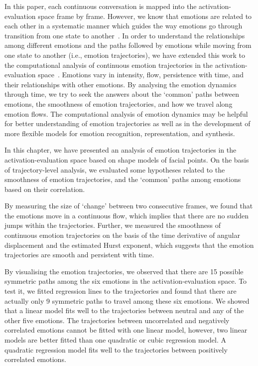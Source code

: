 \documentclass[10pt,journal,cspaper,compsoc]{IEEEtran}
\begin{document}
In this paper, each continuous conversation is mapped into the activation-evaluation space frame by frame. However, we know that emotions are related to each other in a systematic manner which guides the way emotions go through transition from one state to another~\cite{blumberg1991patterns}. In order to understand the relationships among different emotions and the paths followed by emotions while moving from one state to another (i.e., emotion trajectories), we have extended this work to the computational analysis of continuous emotion trajectories in the activation-evaluation space~\cite{hakim2013analysis}. Emotions vary in intensity, flow, persistence with time, and their relationships with other emotions. By analysing the emotion dynamics through time, we try to seek the answers about the `common' paths between emotions, the smoothness of emotion trajectories, and how we travel along emotion flows. The computational analysis of emotion dynamics may be helpful for better understanding of emotion trajectories as well as in the development of more flexible models for emotion recognition, representation, and synthesis.

In this chapter, we have presented an analysis of emotion trajectories in the activation-evaluation space based on shape models of facial points. On the basis of trajectory-level analysis, we evaluated some hypotheses related to the smoothness of emotion trajectories, and the `common' paths among emotions based on their correlation.

By measuring the size of `change' between two consecutive frames, we found that the emotions move in a continuous flow, which implies that there are no sudden jumps within the trajectories. Further, we measured the smoothness of continuous emotion trajectories on the basis of the time derivative of angular displacement and the estimated Hurst exponent, which suggests that the emotion trajectories are smooth and persistent with time.

By visualising the emotion trajectories, we observed that there are 15 possible symmetric paths among the six emotions in the activation-evaluation space. To test it, we fitted regression lines to the trajectories and found that there are actually only 9 symmetric paths to travel among these six emotions. We showed that a linear model fits well to the trajectories between neutral and any of the other five emotions. The trajectories between uncorrelated and negatively correlated emotions cannot be fitted with one linear model, however, two linear models are better fitted than one quadratic or cubic regression model. A quadratic regression model fits well to the trajectories between positively correlated emotions. 
\end{document}

